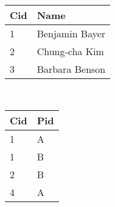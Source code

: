 \begin{itemize}
\begin{enumerate}
    \end{enumerate}
    \begin{minipage}[t]{0.48\textwidth}
        \begin{center}
        \\
	    \begin{tabular}{|l|l|}
	    \hline 
	    Cid & Name \\ 
        \hline
        \hline
	    1 & Benjamin Bayer \\ 
	    \hline 
	    2 & Chung-cha Kim \\ 
	    \hline 
	    3 & Barbara Benson \\ 
	    \hline 
	    \end{tabular}
        \end{center}
    \end{minipage}
    \begin{minipage}[t]{0.45\textwidth}
        \begin{center}
        \\
	    \begin{tabular}{|l|l|}
	    \hline 
	    Cid & Pid \\ 
        \hline
        \hline
	    1 & A \\ 
	    \hline 
	    1 & B \\ 
	    \hline 
	    2 & B \\ 
	    \hline 
	    4 & A \\ 
	    \hline 
	    \end{tabular}
        \end{center}
    \end{minipage}
    

\end{itemize}
